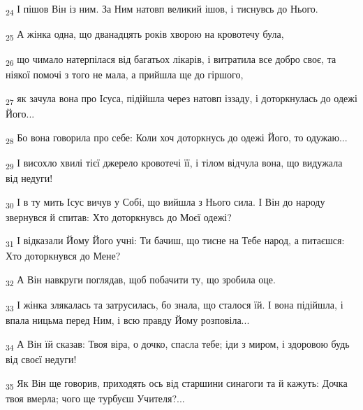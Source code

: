 \begin{tcolorbox}
\textsubscript{24} І пішов Він із ним. За Ним натовп великий ішов, і тиснувсь до Нього.
\end{tcolorbox}
\begin{tcolorbox}
\textsubscript{25} А жінка одна, що дванадцять років хворою на кровотечу була,
\end{tcolorbox}
\begin{tcolorbox}
\textsubscript{26} що чимало натерпілася від багатьох лікарів, і витратила все добро своє, та ніякої помочі з того не мала, а прийшла ще до гіршого,
\end{tcolorbox}
\begin{tcolorbox}
\textsubscript{27} як зачула вона про Ісуса, підійшла через натовп іззаду, і доторкнулась до одежі Його...
\end{tcolorbox}
\begin{tcolorbox}
\textsubscript{28} Бо вона говорила про себе: Коли хоч доторкнусь до одежі Його, то одужаю...
\end{tcolorbox}
\begin{tcolorbox}
\textsubscript{29} І висохло хвилі тієї джерело кровотечі її, і тілом відчула вона, що видужала від недуги!
\end{tcolorbox}
\begin{tcolorbox}
\textsubscript{30} І в ту мить Ісус вичув у Собі, що вийшла з Нього сила. І Він до народу звернувся й спитав: Хто доторкнувсь до Моєї одежі?
\end{tcolorbox}
\begin{tcolorbox}
\textsubscript{31} І відказали Йому Його учні: Ти бачиш, що тисне на Тебе народ, а питаєшся: Хто доторкнувся до Мене?
\end{tcolorbox}
\begin{tcolorbox}
\textsubscript{32} А Він навкруги поглядав, щоб побачити ту, що зробила оце.
\end{tcolorbox}
\begin{tcolorbox}
\textsubscript{33} І жінка злякалась та затрусилась, бо знала, що сталося їй. І вона підійшла, і впала ницьма перед Ним, і всю правду Йому розповіла...
\end{tcolorbox}
\begin{tcolorbox}
\textsubscript{34} А Він їй сказав: Твоя віра, о дочко, спасла тебе; іди з миром, і здоровою будь від своєї недуги!
\end{tcolorbox}
\begin{tcolorbox}
\textsubscript{35} Як Він ще говорив, приходять ось від старшини синагоги та й кажуть: Дочка твоя вмерла; чого ще турбуєш Учителя?...
\end{tcolorbox}
